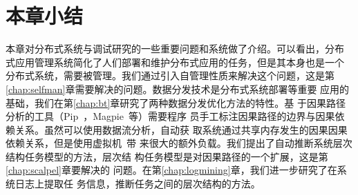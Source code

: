 \section{本章小结}

本章对分布式系统与调试研究的一些重要问题和系统做了介绍。可以看出，分布
式应用管理系统简化了人们部署和维护分布式应用的任务，但是其本身也是一个
分布式系统，需要被管理。我们通过引入自管理性质来解决这个问题，这是第
\ref{chap:selfman}章需要解决的问题。数据分发技术是分布式系统部署等重要
应用的基础，我们在第\ref{chap:bt}章研究了两种数据分发优化方法的特性。基
于因果路径分析的工具（Pip~\cite{pip}，Magpie~\cite{magpie}等）需要程序
员手工标注因果路径的边界与因果依赖关系。虽然可以使用数据流分析，自动获
取系统通过共享内存发生的因果因果依赖关系，但是使用虚拟机~\cite{qemu}带
来很大的额外负载。我们提出了自动推断系统层次结构任务模型的方法，层次结
构任务模型是对因果路径的一个扩展，这是第\ref{chap:scalpel}章要解决的
问题。在第\ref{chap:logmining}章，我们进一步研究了在系统日志上提取任
务信息，推断任务之间的层次结构的方法。

